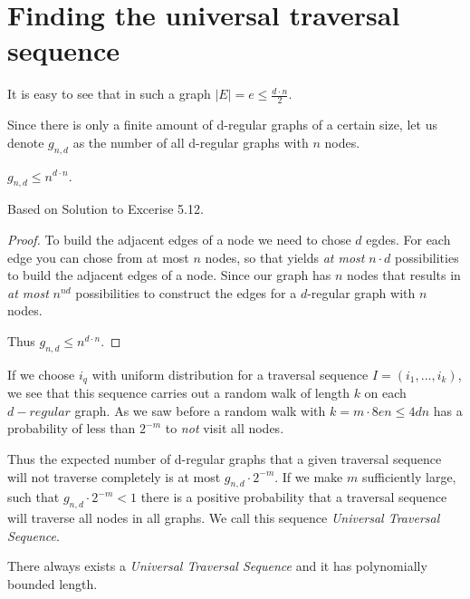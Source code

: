 \section{Finding the universal traversal
sequence}\label{finding-the-universal-traversal-sequence}

It is easy to see that in such a graph
$|E| = e \leq \frac{d \cdot n}{2}$.

Since there is only a finite amount of d-regular graphs of a certain
size, let us denote $g_{n,d}$ as the number of all d-regular graphs with
$n$ nodes.

\vspace{0.5cm}

\begin{thm}
$g_{n,d} \leq n^{d \cdot n}$.
\end{thm}

Based on  Solution to Excerise
5.12.

\begin{proof}
To build the adjacent edges of a node we need to chose $d$ egdes. For each edge you can chose from at most $n$ nodes,
so that yields {\em at most} $n \cdot d$ possibilities to build the adjacent edges of a node.
Since our graph has $n$ nodes that results in {\em at most} $n^{nd}$ possibilities to construct the edges for a $d$-regular graph with $n$ nodes.

Thus $g_{n,d} \leq n^{d \cdot n}$.
\end{proof}

If we choose $i_q$ with uniform distribution for a traversal sequence
$I = (i_1, ..., i_k)$, we see that this sequence carries out a random
walk of length $k$ on each $d-regular$ graph. As we saw before a random
walk with $k = m \cdot 8en \leq 4dn$ has a probability of less than
$2^{-m}$ to \emph{not} visit all nodes.

Thus the expected number of d-regular graphs that a given traversal
sequence will not traverse completely is at most
$g_{n, d} \cdot 2^{-m}$. If we make $m$ sufficiently large, such that
$g_{n, d} \cdot 2^{-m} < 1$ there is a positive probability that a
traversal sequence will traverse all nodes in all graphs. We call this
sequence \emph{Universal Traversal Sequence}.

\vspace{0.5cm}

\begin{thm}
There always exists a {\em Universal Traversal Sequence} and it has polynomially bounded length.
\end{thm}

